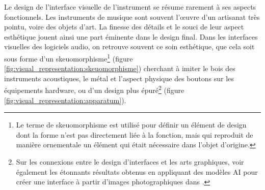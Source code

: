 \noindent Le design de l'interface visuelle de l'instrument se résume rarement à ses aspects fonctionnels. Les instruments de musique sont souvent l'œuvre d'un artisanat très pointu, voire des objets d'art. La finesse des détails et le souci de leur aspect esthétique jouent ainsi une part éminente dans le design final. Dans les interfaces visuelles des logiciels audio, on retrouve souvent ce soin esthétique, que cela soit sous forme d'un skeuomorphisme\footnote{Le terme de skeuomorphisme est utilisé pour définir un élément de design dont la forme n'est pas directement liée à la fonction, mais qui reproduit de manière ornementale un élément qui était nécessaire dans l'objet d'origine.} (figure \ref{fig:visual_representation:skeuomorphisme}) cherchant à imiter le bois des instruments acoustiques, le métal et l'aspect physique des boutons sur les équipements hardware, ou d'un design plus épuré\footnote{Sur les connexions entre le design d'interfaces et les arts graphiques, voir également les étonnants résultats obtenus en appliquant des modèles AI pour créer une interface à partir d'images photographiques dans \cite{troyer_mondrian_2019}.}  (figure \ref{fig:visual_representation:apparatum}).

